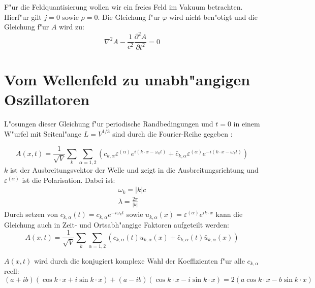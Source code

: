 F"ur die Feldquantisierung wollen wir ein freies Feld im Vakuum betrachten. Hierf"ur gilt $j = 0$ sowie $\rho = 0$.
Die Gleichung f"ur $\varphi$ wird nicht ben"otigt und die Gleichung f"ur $A$ wird zu:
\begin{equation} \label{fq:wave_dgl}
\nabla^2 A - \frac{1}{c^2} \frac{\partial^2 A }{\partial t^2} = 0
\end{equation}

\section{Vom Wellenfeld zu unabh"angigen Oszillatoren}
L"osungen dieser Gleichung f"ur periodische Randbedingungen und $t=0$ in einem W"urfel mit Seitenl"ange $L = V^{1/3}$ sind durch die Fourier-Reihe gegeben \cite{fq:em_wave_eq}:

\begin{equation} \label{fq:wave_eq}
A(x,t) = \frac{1}{\sqrt{V}} \sum_k \sum_{\alpha=1,2} \left(c_{k,\alpha} \varepsilon^{(\alpha)} e^{i (k \cdot x - \omega_k t)} + \bar{c}_{k,\alpha} \varepsilon^{(\alpha)} e^{-i(k \cdot x - \omega_k t)}\right)
\end{equation}
$k$ ist der Ausbreitungsvektor der Welle und zeigt in die Ausbreitungsrichtung und $\varepsilon^{(\alpha)}$ ist die Polarisation. Dabei ist:
\begin{align*}
\omega_k=|k|c \\
\lambda = \frac{2 \pi}{|k|}
\end{align*}
Durch setzen von $c_{k,\alpha}(t) = c_{k,\alpha} e^{-i \omega_k t}$ sowie $u_{k,\alpha}(x) = \varepsilon^{(\alpha)} e^{ik \cdot x}$ kann die Gleichung auch in Zeit- und Ortsabh"angige Faktoren aufgeteilt werden:
\begin{equation*}
A(x,t) = \frac{1}{\sqrt{V}} \sum_k \sum_{\alpha=1,2} \left(c_{k,\alpha}(t)u_{k,\alpha}(x) + \bar{c}_{k,\alpha}(t) \bar{u}_{k,\alpha}(x) \right)
\end{equation*}

$A(x,t)$ wird durch die konjugiert komplexe Wahl der Koeffizienten f"ur alle $c_{k,\alpha}$ reell:
\begin{equation*}
(a + ib)(\cos k \cdot x + i \sin k \cdot x ) + (a - ib)(\cos k \cdot x - i \sin k \cdot x ) = 2 ( a \cos k \cdot x - b \sin k \cdot x )
\end{equation*}

